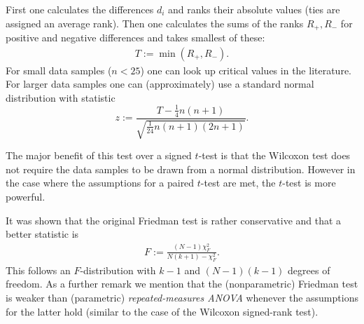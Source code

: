 {{        \qquad First one calculates the differences $d_i$ and ranks their absolute values (ties are assigned an average rank). Then one calculates the sums of the ranks $R_+, R_-$ for positive and negative differences and takes smallest of these:
        \begin{gather}
            T:=\min(R_+, R_-).
        \end{gather}
        For small data samples ($n<25$) one can look up critical values in the literature. For larger data samples one can (approximately) use a standard normal distribution with statistic \[z := \frac{T-\frac{1}{4}n(n+1)}{\sqrt{\frac{1}{24}n(n+1)(2n+1)}}.\]
    }
    \begin{remark}
        The major benefit of this test over a signed $t$-test is that the Wilcoxon test does not require the data samples to be drawn from a normal distribution. However in the case where the assumptions for a paired $t$-test are met, the $t$-test is more powerful.
    \end{remark}


    \begin{remark}
        It was shown that the original Friedman test is rather conservative and that a better statistic is
        \begin{gather}
            F := \frac{(N-1)\chi^2_F}{N(k+1)-\chi^2_F}.
        \end{gather}
        This follows an $F$-distribution with $k-1$ and $(N-1)(k-1)$ degrees of freedom. As a further remark we mention that the (nonparametric) Friedman test is weaker than (parametric) \textit{repeated-measures ANOVA} whenever the assumptions for the latter hold (similar to the case of the Wilcoxon signed-rank test).
    \end{remark}

}
